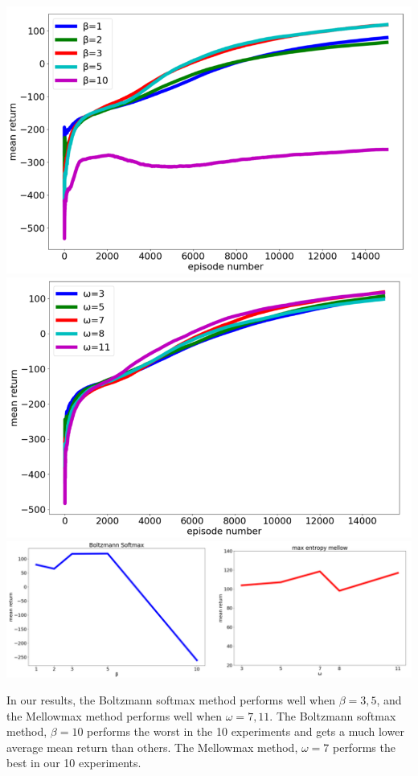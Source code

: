 \begin{center}
    \includegraphics[scale=0.4]{lunar_rep1.png}
    \includegraphics[scale=0.4]{lunar_rep2.png}\\
    \includegraphics[scale=0.6]{lunar_rep3.png}
\end{center}
In our results, the Boltzmann softmax method performs well when $\beta=3, 5$, and the Mellowmax method 
performs well when $\omega=7, 11$. The Boltzmann softmax method, $\beta=10$ performs the worst in the 10 experiments and
gets a much lower average mean return than others. The Mellowmax method, $\omega=7$ performs the best in our 10 experiments.\\\\
